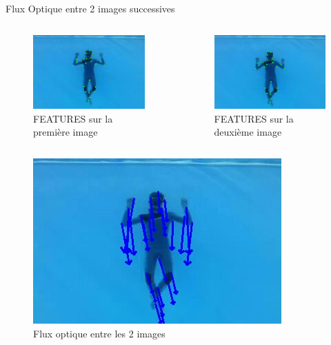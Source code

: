 \documentclass{bredelebeamer}
\begin{document}
\begin{frame}{Flux Optique entre 2 images successives}

\begin{columns}
\begin{column}{0.3\textwidth}
\begin{figure}
\centering
\includegraphics[scale=0.3]{images/plongeurInitFeatures.jpeg}
\caption{FEATURES sur la première image}
\end{figure}
\end{column}


\begin{column}{0.3\textwidth}
\begin{figure}
\centering
\includegraphics[scale=0.3]{images/plongeurNextFeatures.jpeg}
\caption{FEATURES sur la deuxième image}
\end{figure}
\end{column}

\end{columns}

\begin{figure}
\centering
\includegraphics[scale=0.3]{images/plongeurOpticalFlow.jpeg}
\caption{Flux optique entre les 2 images}
\end{figure}


\end{frame}
\end{document}
